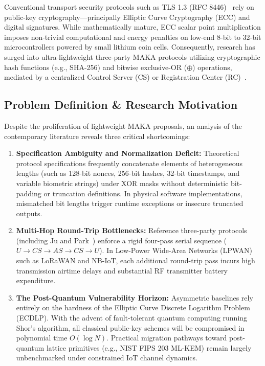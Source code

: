 \documentclass[journal,10pt,twocolumn]{IEEEtran}
\begin{document}
Conventional transport security protocols such as TLS 1.3 (RFC 8446)~\cite{rfc8446} rely on public-key cryptography—principally Elliptic Curve Cryptography (ECC) and digital signatures. While mathematically mature, ECC scalar point multiplication imposes non-trivial computational and energy penalties on low-end 8-bit to 32-bit microcontrollers powered by small lithium coin cells. Consequently, research has surged into ultra-lightweight three-party MAKA protocols utilizing cryptographic hash functions (e.g., SHA-256) and bitwise exclusive-OR ($\oplus$) operations, mediated by a centralized Control Server (CS) or Registration Center (RC)~\cite{jupark2023,challa2018,turkanovic2014,amin2016}.

\subsection{Problem Definition \& Research Motivation}
Despite the proliferation of lightweight MAKA proposals, an analysis of the contemporary literature reveals three critical shortcomings:
\begin{enumerate}
    \item \textbf{Specification Ambiguity and Normalization Deficit:} Theoretical protocol specifications frequently concatenate elements of heterogeneous lengths (such as 128-bit nonces, 256-bit hashes, 32-bit timestamps, and variable biometric strings) under XOR masks without deterministic bit-padding or truncation definitions. In physical software implementations, mismatched bit lengths trigger runtime exceptions or insecure truncated outputs.
    \item \textbf{Multi-Hop Round-Trip Bottlenecks:} Reference three-party protocols (including Ju and Park~\cite{jupark2023}) enforce a rigid four-pass serial sequence ($U \rightarrow CS \rightarrow AS \rightarrow CS \rightarrow U$). In Low-Power Wide-Area Networks (LPWAN) such as LoRaWAN and NB-IoT, each additional round-trip pass incurs high transmission airtime delays and substantial RF transmitter battery expenditure.
    \item \textbf{The Post-Quantum Vulnerability Horizon:} Asymmetric baselines rely entirely on the hardness of the Elliptic Curve Discrete Logarithm Problem (ECDLP). With the advent of fault-tolerant quantum computing running Shor's algorithm, all classical public-key schemes will be compromised in polynomial time $O(\log N)$. Practical migration pathways toward post-quantum lattice primitives (e.g., NIST FIPS 203 ML-KEM) remain largely unbenchmarked under constrained IoT channel dynamics.
\end{enumerate}
\end{document}
